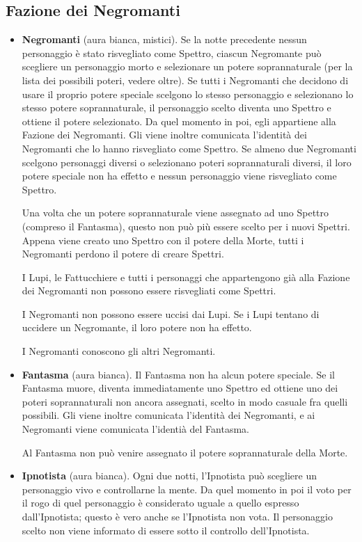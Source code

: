 \documentclass[a4paper,10pt]{article}
\begin{document}
\subsection*{Fazione dei Negromanti}
\label{spettri}
\begin{itemize}

 \item {\bf Negromanti} (aura bianca, mistici).
 Se la notte precedente nessun personaggio è stato risvegliato come Spettro, ciascun Negromante può scegliere un personaggio morto e selezionare un potere soprannaturale (per la lista dei possibili poteri, vedere oltre).
 Se tutti i Negromanti che decidono di usare il proprio potere speciale scelgono lo stesso personaggio e selezionano lo stesso potere soprannaturale, il personaggio scelto diventa uno Spettro e ottiene il potere selezionato.
 Da quel momento in poi, egli appartiene alla Fazione dei Negromanti. Gli viene inoltre comunicata l'identità dei Negromanti che lo hanno risvegliato come Spettro.
 Se almeno due Negromanti scelgono personaggi diversi o selezionano poteri soprannaturali diversi, il loro potere speciale non ha effetto e nessun personaggio viene risvegliato come Spettro.
 
 Una volta che un potere soprannaturale viene assegnato ad uno Spettro (compreso il Fantasma), questo non può più essere scelto per i nuovi Spettri. Appena viene creato uno Spettro con il potere della Morte, tutti i Negromanti perdono il potere di creare Spettri.
 
 I Lupi, le Fattucchiere e tutti i personaggi che appartengono già alla Fazione dei Negromanti non possono essere risvegliati come Spettri.

 I Negromanti non possono essere uccisi dai Lupi. Se i Lupi tentano di uccidere un Negromante, il loro potere non ha effetto.

 I Negromanti conoscono gli altri Negromanti.
 
 \item {\bf Fantasma} (aura bianca). Il Fantasma non ha alcun potere speciale. Se il Fantasma muore, diventa immediatamente uno Spettro ed ottiene uno dei poteri soprannaturali non ancora assegnati, scelto in modo casuale fra quelli possibili. Gli viene inoltre comunicata l'identità dei Negromanti, e ai Negromanti viene comunicata l'identià del Fantasma.
 
 Al Fantasma non può venire assegnato il potere soprannaturale della Morte.
 
 \item {\bf Ipnotista} (aura bianca). Ogni due notti, l'Ipnotista può scegliere un personaggio vivo e controllarne la mente.
 Da quel momento in poi il voto per il rogo di quel personaggio è considerato uguale a quello espresso dall'Ipnotista; questo è vero anche se l'Ipnotista non vota.
 Il personaggio scelto non viene informato di essere sotto il controllo dell'Ipnotista.
 

\end{itemize}
\end{document}
